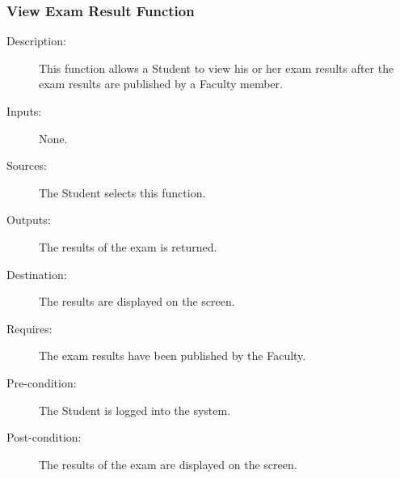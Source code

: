 \subsubsection{\large View Exam Result Function} 
\begin{boxed} %
\small\begin{description}
\item[Description:]
   This function allows a Student to view his or her exam results after the exam
   results are published by a Faculty member.
\item[Inputs:]
   None.
\item[Sources:]
   The Student selects this function.
\item[Outputs:]
   The results of the exam is returned.
\item[Destination:]
   The results are displayed on the screen.
\item[Requires:]
   The exam results have been published by the Faculty.
\item[Pre-condition:]
   The Student is logged into the system.
\item[Post-condition:]
   The results of the exam are displayed on the screen.
\end{description}
\normalsize
\end{boxed} %
